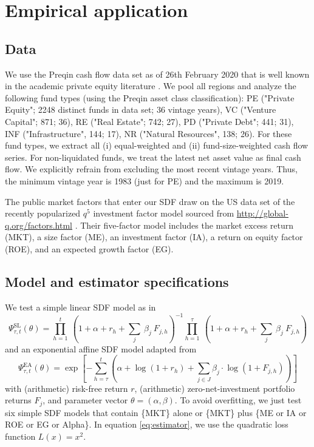 \documentclass[12pt]{article}
\begin{document}
\section{Empirical application}
\label{sec:empirical_application}

\subsection{Data}

We use the Preqin cash flow data set as of 26th February 2020 that is well known in the academic private equity literature \citep{HJK14,KN16,ACGP18}.
We pool all regions and analyze the following fund types (using the Preqin asset class classification):
PE ("Private Equity"; 2248 distinct funds in data set; 36 vintage years),
VC ("Venture Capital"; 871; 36),
RE ("Real Estate"; 742; 27),
PD ("Private Debt"; 441; 31),
INF ("Infrastructure", 144; 17), 
NR ("Natural Resources", 138; 26).
For these fund types, we extract all (i) equal-weighted and (ii) fund-size-weighted cash flow series.
For non-liquidated funds, we treat the latest net asset value as final cash flow.
We explicitly refrain from excluding the most recent vintage years.
Thus, the minimum vintage year is 1983 (just for PE) and the maximum is 2019.

The public market factors that enter our SDF draw on the US data set of the recently popularized $q^5$ investment factor model sourced from \url{http://global-q.org/factors.html} \citep{HXZ15,HXZ20}. 
Their five-factor model includes the market excess return (MKT), a size factor (ME), an investment factor (IA), a return on equity factor (ROE), and an expected growth factor (EG).


\subsection{Model and estimator specifications}
\label{sec:model_selection}
We test a simple linear SDF model as in \cite{DLP12}
\begin{equation}
\label{eq:linear_sdf}
\Psi_{\tau,t}^{\mathrm{SL}} (\theta) = 
\prod_{h=1}^{t}\ \left(1 + \alpha + r_{h} + \sum_j\ \beta_j\ F_{j,h} \right)^{-1}
\prod_{h=1}^{\tau}\ \left(1 + \alpha + r_{h} + \sum_j\ \beta_j \ F_{j,h} \right)
\end{equation}
and an exponential affine SDF model adapted from \cite{KN16}
\begin{equation}
\label{eq:expaff_SDF}
\Psi_{\tau,t}^{\mathrm{EA}} (\theta) = 
\exp
\left[
-
\sum_{h=\tau}^{t} \left( \alpha + \log (1 + r_h) + \sum_{j \in J} \beta_{j} \cdot \log (1 + F_{j,h}) \right)
\right]
\end{equation}
with (arithmetic) risk-free return $r$, (arithmetic) zero-net-investment portfolio returns $F_j$, and parameter vector $\theta=(\alpha,\beta)$.
To avoid overfitting, we just test six simple SDF models that contain \{MKT\} alone or \{MKT\} plus \{ME or IA or ROE or EG or Alpha\}.
In equation \ref{eq:estimator}, we use the quadratic loss function $L(x)=x^2$.
\end{document}
